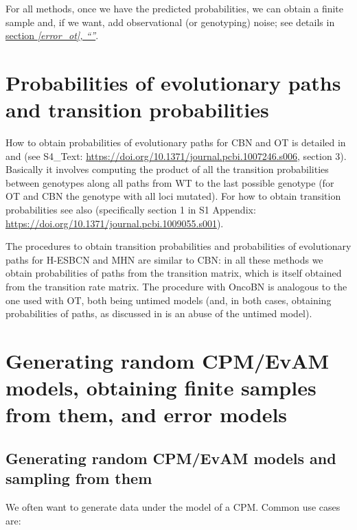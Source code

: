 \documentclass[a4paper,11pt]{article}
\newcommand*{\qrefS}[1]{\hyperref[{#1}]{section \textit{\ref*{#1},
      ``\nameref*{#1}''}}}
\begin{document}

\vspace*{15pt}

For all methods, once we have the predicted probabilities, we can obtain a finite sample and, if we want, add observational (or genotyping) noise; see details in \qrefS{error_ot}.


\section{Probabilities of evolutionary paths and transition probabilities}\label{probpaths}

How to obtain probabilities of evolutionary paths for CBN and OT is detailed in \cite{hosseini2019a} and \cite{diaz2019every} (see S4\_Text: \url{https://doi.org/10.1371/journal.pcbi.1007246.s006}, section 3). Basically it involves computing the product of all the transition probabilities between genotypes along all paths from WT to the last possible genotype (for OT and CBN the genotype with all loci mutated). For how to obtain transition probabilities see also \cite{diaz2021conditional} (specifically section 1 in S1 Appendix: \url{https://doi.org/10.1371/journal.pcbi.1009055.s001}).

The procedures to obtain transition probabilities and probabilities of evolutionary paths for H-ESBCN and MHN are similar to CBN: in all these methods we obtain probabilities of paths from the transition matrix, which is itself obtained from the transition rate matrix. The procedure with OncoBN is analogous to the one used with OT, both being untimed models (and, in both cases, obtaining probabilities of paths, as discussed in \citealp{diaz2019every} is an abuse of the untimed model). 


\section{Generating random CPM/EvAM models, obtaining finite samples from them, and error models}\label{sec:random_evam}


\subsection{Generating random CPM/EvAM models and sampling from them}\label{subsec:random_evam}
We often want to generate data under the model of a CPM. Common use cases are:
\end{document}

